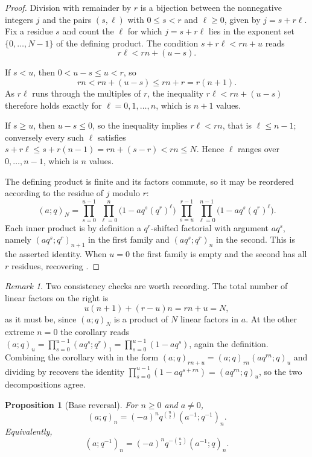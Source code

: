 \documentclass[11pt,oneside,openany]{book}
\newtheorem{proposition}[proposition]{Proposition}
\theoremstyle{definition}
\theoremstyle{remark}
\newtheorem{remark}[remark]{Remark}
\begin{document}
\begin{proof}
Division with remainder by $r$ is a bijection between the nonnegative integers $j$ and the pairs $(s,\ell)$ with $0\le s<r$ and $\ell\ge0$, given by $j=s+r\ell$.  Fix a residue $s$ and count the $\ell$ for which $j=s+r\ell$ lies in the exponent set $\{0,\ldots,N-1\}$ of the defining product.  The condition $s+r\ell<rn+u$ reads
\[
 r\ell<rn+(u-s).
\]

If $s<u$, then $0<u-s\le u<r$, so
\[
 rn<rn+(u-s)\le rn+r=r(n+1).
\]
As $r\ell$ runs through the multiples of $r$, the inequality $r\ell<rn+(u-s)$ therefore holds exactly for $\ell=0,1,\ldots,n$, which is $n+1$ values.

If $s\ge u$, then $u-s\le0$, so the inequality implies $r\ell<rn$, that is $\ell\le n-1$; conversely every such $\ell$ satisfies $s+r\ell\le s+r(n-1)=rn+(s-r)<rn\le N$.  Hence $\ell$ ranges over $0,\ldots,n-1$, which is $n$ values.

The defining product is finite and its factors commute, so it may be reordered according to the residue of $j$ modulo $r$:
\[
 (a;q)_N
 =\prod_{s=0}^{u-1}\ \prod_{\ell=0}^{n}\bigl(1-aq^{s}(q^{r})^{\ell}\bigr)\;
  \prod_{s=u}^{r-1}\ \prod_{\ell=0}^{n-1}\bigl(1-aq^{s}(q^{r})^{\ell}\bigr).
\]
Each inner product is by definition a $q^r$-shifted factorial with argument $aq^s$, namely $(aq^s;q^r)_{n+1}$ in the first family and $(aq^s;q^r)_n$ in the second.  This is the asserted identity.  When $u=0$ the first family is empty and the second has all $r$ residues, recovering .
\end{proof}

\begin{remark}\label{rem:dissection-remainder-checks}
Two consistency checks are worth recording.  The total number of linear factors on the right is
\[
 u(n+1)+(r-u)n=rn+u=N,
\]
as it must be, since $(a;q)_N$ is a product of $N$ linear factors in $a$.  At the other extreme $n=0$ the corollary reads $(a;q)_u=\prod_{s=0}^{u-1}(aq^s;q^r)_1=\prod_{s=0}^{u-1}(1-aq^s)$, again the definition.  Combining the corollary with  in the form $(a;q)_{rn+u}=(a;q)_{rn}(aq^{rn};q)_u$ and dividing by  recovers the identity $\prod_{s=0}^{u-1}(1-aq^{s+rn})=(aq^{rn};q)_u$, so the two decompositions agree.
\end{remark}

\begin{proposition}[Base reversal]\label{prop:base-reversal}
For $n\ge0$ and $a\ne0$,
\[
 (a;q)_n=(-a)^n q^{\binom n2}(a^{-1};q^{-1})_n.
\]
Equivalently,
\[
 (a;q^{-1})_n=(-a)^nq^{-\binom n2}(a^{-1};q)_n.
\]
\end{proposition}
\end{document}
